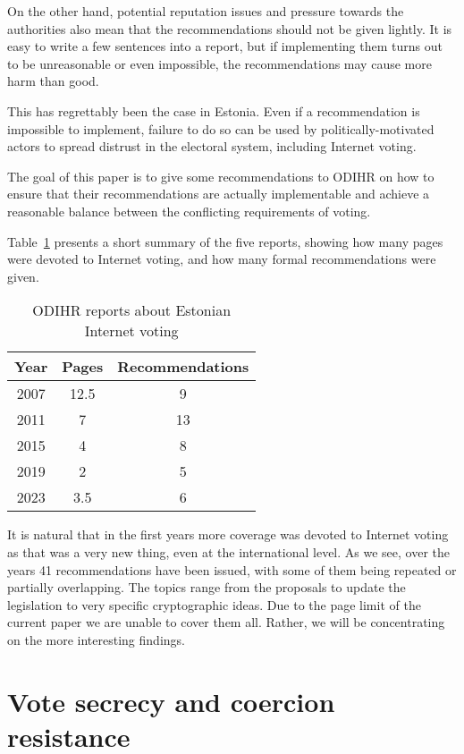 \documentclass{llncs}
\begin{document}
On the other hand, potential reputation issues and pressure towards the authorities also mean that the recommendations should not be given lightly. It is easy to write a few sentences into a report, but if implementing them turns out to be unreasonable or even impossible, the recommendations may cause more harm than good. 

This has regrettably been the case in Estonia. Even if a recommendation is impossible to implement, failure to do so can be used by politically-motivated actors to spread distrust in the electoral system, including Internet voting. 

The goal of this paper is to give some recommendations to ODIHR on how to ensure that their recommendations are actually implementable and achieve a reasonable balance between the conflicting requirements of voting. 

Table~\ref{tab:ODIHRreports} presents a short summary of the five reports, showing how many pages were devoted to Internet voting, and how many formal recommendations were given.

\begin{table}[ht]
    \centering
    \caption{ODIHR reports about Estonian Internet voting}
    \label{tab:ODIHRreports}
    \begin{tabular}{ccc}
        \toprule    
        Year & Pages & Recommendations\\
        \midrule
        2007 & 12.5 & 9\\
        2011 & 7    & 13\\
        2015 & 4    & 8\\
        2019 & 2    & 5\\
        2023 & 3.5  & 6\\
        \bottomrule
    \end{tabular}
\end{table}

It is natural that in the first years more coverage was devoted to Internet voting as that was a very new thing, even at the international level. As we see, over the years 41 recommendations have been issued, with some of them being repeated or partially overlapping. The topics range from the proposals to update the legislation to very specific cryptographic ideas. Due to the page limit of the current paper we are unable to cover them all. Rather, we will be concentrating on the more interesting findings.

\section{Vote secrecy and coercion resistance}
\label{sec:votesecrecy}
\end{document}
